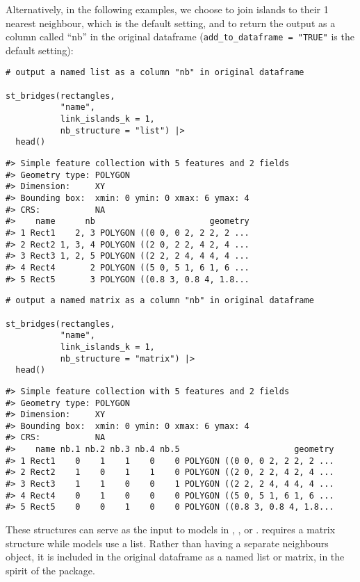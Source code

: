 Alternatively, in the following examples, we choose to join islands to their 1 nearest
neighbour, which is the default setting, and to return the output as a column called ``nb'' in the original
 dataframe (\texttt{add\_to\_dataframe\ =\ "TRUE"} is the default setting):

\begin{verbatim}
# output a named list as a column "nb" in original dataframe

st_bridges(rectangles,
           "name",
           link_islands_k = 1,
           nb_structure = "list") |>
  head()
\end{verbatim}

\begin{verbatim}
#> Simple feature collection with 5 features and 2 fields
#> Geometry type: POLYGON
#> Dimension:     XY
#> Bounding box:  xmin: 0 ymin: 0 xmax: 6 ymax: 4
#> CRS:           NA
#>    name      nb                       geometry
#> 1 Rect1    2, 3 POLYGON ((0 0, 0 2, 2 2, 2 ...
#> 2 Rect2 1, 3, 4 POLYGON ((2 0, 2 2, 4 2, 4 ...
#> 3 Rect3 1, 2, 5 POLYGON ((2 2, 2 4, 4 4, 4 ...
#> 4 Rect4       2 POLYGON ((5 0, 5 1, 6 1, 6 ...
#> 5 Rect5       3 POLYGON ((0.8 3, 0.8 4, 1.8...
\end{verbatim}

\begin{verbatim}
# output a named matrix as a column "nb" in original dataframe

st_bridges(rectangles,
           "name",
           link_islands_k = 1,
           nb_structure = "matrix") |>
  head()
\end{verbatim}

\begin{verbatim}
#> Simple feature collection with 5 features and 2 fields
#> Geometry type: POLYGON
#> Dimension:     XY
#> Bounding box:  xmin: 0 ymin: 0 xmax: 6 ymax: 4
#> CRS:           NA
#>    name nb.1 nb.2 nb.3 nb.4 nb.5                       geometry
#> 1 Rect1    0    1    1    0    0 POLYGON ((0 0, 0 2, 2 2, 2 ...
#> 2 Rect2    1    0    1    1    0 POLYGON ((2 0, 2 2, 4 2, 4 ...
#> 3 Rect3    1    1    0    0    1 POLYGON ((2 2, 2 4, 4 4, 4 ...
#> 4 Rect4    0    1    0    0    0 POLYGON ((5 0, 5 1, 6 1, 6 ...
#> 5 Rect5    0    0    1    0    0 POLYGON ((0.8 3, 0.8 4, 1.8...
\end{verbatim}

These structures can serve as the input to models in ,
,  \citep{rstan} or .  requires a matrix structure while  models use a list. Rather than having a separate neighbours
object, it is included in the original  dataframe as a named list or matrix, in the spirit of the  package.

